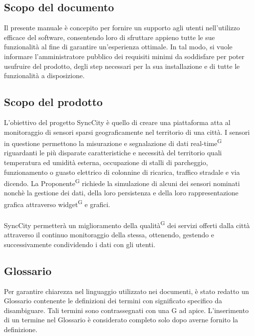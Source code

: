 \documentclass[8pt]{article}
\newcommand{\glossterm}[1]{#1\textsuperscript{G}} %
\begin{document}
\subsection{Scopo del documento}
Il presente manuale è concepito per fornire un supporto agli utenti nell’utilizzo efficace del software, 
consentendo loro di sfruttare appieno tutte le sue funzionalità al fine di garantire un’esperienza ottimale.
In tal modo, si vuole informare l’amministratore pubblico dei requisiti minimi da soddisfare per
poter usufruire del prodotto, degli step necessari per la sua installazione e di tutte le funzionalità a disposizione.
\subsection{Scopo del prodotto}
L'obiettivo del progetto SyncCity è quello di creare una piattaforma atta al monitoraggio
di sensori sparsi geograficamente nel territorio di una città. I sensori in questione
permettono la misurazione e segnalazione di dati \glossterm{real-time} riguardanti le più disparate
caratteristiche e necessità del territorio quali temperatura ed umidità esterna, occupazione di
stalli di parcheggio, funzionamento o guasto elettrico di colonnine di ricarica, traffico stradale e via
dicendo. La \glossterm{Proponente} richiede la simulazione di alcuni dei sensori nominati nonchè la
gestione dei dati, della loro persistenza e della loro rappresentazione grafica attraverso \glossterm{widget} e
grafici. 
\\\\SyncCity permetterà un miglioramento della \glossterm{qualità} dei servizi offerti dalla città attraverso il continuo monitoraggio della stessa, ottenendo, gestendo e successivamente condividendo i dati con gli utenti. 
\subsection{Glossario}
Per garantire chiarezza nel linguaggio utilizzato nei documenti, è stato redatto un Glossario contenente le definizioni dei termini con significato specifico da disambiguare. Tali termini sono contrassegnati con una G ad apice. L'inserimento di un termine nel Glossario è considerato completo solo dopo averne fornito la definizione.
\end{document}
